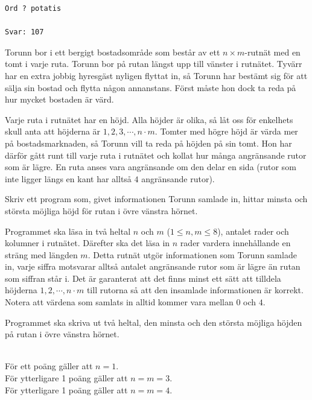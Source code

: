 \vspace{1cm}

\begin{verbatim}
Ord ? potatis

Svar: 107
\end{verbatim}


\newpage
{}


\noindent
Torunn bor i ett bergigt bostadsområde som består av ett $n \times m$-rutnät med en tomt i varje ruta.
Torunn bor på rutan längst upp till vänster i rutnätet.
Tyvärr har en extra jobbig hyresgäst nyligen flyttat in, så Torunn har bestämt sig för att sälja sin bostad och flytta någon annanstans.
Först måste hon dock ta reda på hur mycket bostaden är värd.

Varje ruta i rutnätet har en höjd. Alla höjder är olika, så låt oss för enkelhets skull anta att höjderna är $1, 2, 3, \cdots, n\cdot m$.
Tomter med högre höjd är värda mer på bostadsmarknaden, så Torunn vill ta reda på höjden på sin tomt. Hon har därför gått runt till varje ruta i rutnätet och kollat hur många angränsande rutor som är lägre.
En ruta anses vara angränsande om den delar en sida (rutor som inte ligger längs en kant har alltså $4$ angränsande rutor).

Skriv ett program som, givet informationen Torunn samlade in, hittar minsta och största möjliga höjd för rutan i övre vänstra hörnet.

Programmet ska läsa in två heltal $n$ och $m$ ($1 \leq n,m \leq 8$), antalet rader och kolumner i
rutnätet. Därefter ska det läsa in $n$ rader vardera innehållande en sträng med längden $m$. Detta rutnät utgör informationen
som Torunn samlade in, varje siffra motsvarar alltså antalet angränsande rutor som är lägre än rutan som
siffran står i. Det är garanterat att det finns minst ett sätt att tilldela höjderna 
$1, 2, \cdots, n\cdot m$ till rutorna så att den insamlade informationen är korrekt. Notera att värdena
som samlats in alltid kommer vara mellan $0$ och $4$.

Programmet ska skriva ut två heltal, den minsta och den största möjliga höjden på rutan i övre vänstra hörnet.

\\
För ett poäng gäller att $n = 1$.\\
För ytterligare 1 poäng gäller att $n = m = 3$.\\
För ytterligare 1 poäng gäller att $n = m = 4$.\\

